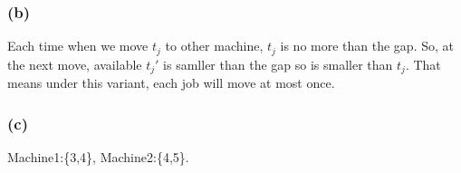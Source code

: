 \documentclass[a4paper]{article}
\begin{document}
\subsubsection*{(b)}
Each time when we move $t_j$ to other machine, $t_j$ is no more than the gap. So, at the next move, available $t_j'$ is samller than the gap so is smaller than $t_j$. That means under this variant, each job will move at most once.

\subsubsection*{(c)}
Machine1:\{3,4\}, Machine2:\{4,5\}. 



%	

\end{document}
